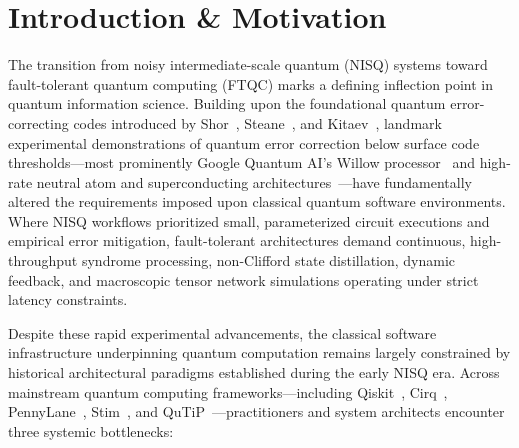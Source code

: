\documentclass[aps,prx,twocolumn,superscriptaddress,nofootinbib]{revtex4-2}
\begin{document}

\maketitle

\section{Introduction \& Motivation}
\label{sec:intro}

The transition from noisy intermediate-scale quantum (NISQ) systems toward fault-tolerant quantum computing (FTQC) marks a defining inflection point in quantum information science. Building upon the foundational quantum error-correcting codes introduced by Shor~\cite{shor1995scheme}, Steane~\cite{steane1996error}, and Kitaev~\cite{kitaev2003fault}, landmark experimental demonstrations of quantum error correction below surface code thresholds---most prominently Google Quantum AI's Willow processor~\cite{google2024willow,google2023suppressing,google2021exponential} and high-rate neutral atom and superconducting architectures~\cite{bravyi2024high}---have fundamentally altered the requirements imposed upon classical quantum software environments. Where NISQ workflows prioritized small, parameterized circuit executions and empirical error mitigation, fault-tolerant architectures demand continuous, high-throughput syndrome processing, non-Clifford state distillation, dynamic feedback, and macroscopic tensor network simulations operating under strict latency constraints.

Despite these rapid experimental advancements, the classical software infrastructure underpinning quantum computation remains largely constrained by historical architectural paradigms established during the early NISQ era. Across mainstream quantum computing frameworks---including Qiskit~\cite{qiskit2019framework}, Cirq~\cite{cirq2020developers}, PennyLane~\cite{pennylane2018bergholm}, Stim~\cite{stim2021gidney}, and QuTiP~\cite{qutip2012johansson}---practitioners and system architects encounter three systemic bottlenecks:
\end{document}
